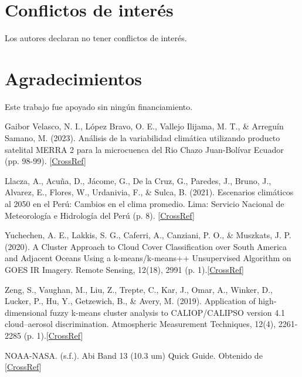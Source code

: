 \documentclass[twocolumn]{IECEjournal} %
\begin{document}
\section*{Conflictos de interés}
Los autores declaran no tener conflictos de interés.

\section*{Agradecimientos}
Este trabajo fue apoyado sin ningún financiamiento.

%

\begin{fullwidth}
\renewcommand{\bibname}{Referencias}
\begin{thebibliography}{99}
 Gaibor Velasco, N. I., López Bravo, O. E., Vallejo Ilijama, M. T., \& Arreguín Samano, M. (2023). Análisis de la variabilidad climática utilizando producto satelital MERRA 2 para la microcuenca del Rio Chazo Juan-Bolívar Ecuador (pp. 98-99). [\href{https://doi.org/10.5281/zenodo.7930679}{CrossRef}]

 Llacza, A., Acuña, D., Jácome, G., De la Cruz, G., Paredes, J., Bruno, J., Alvarez, E., Flores, W., Urdanivia, F., \& Sulca, B. (2021). Escenarios climáticos al 2050 en el Perú: Cambios en el clima promedio. Lima: Servicio Nacional de Meteorología e Hidrología del Perú (p. 8). [\href{https://hdl.handle.net/20.500.12542/1470}{CrossRef}]

 Yuchechen, A. E., Lakkis, S. G., Caferri, A., Canziani, P. O., \& Muszkats, J. P. (2020). A Cluster Approach to Cloud Cover Classification over South America and Adjacent Oceans Using a k-means/k-means++ Unsupervised Algorithm on GOES IR Imagery. Remote Sensing, 12(18), 2991 (p. 1).[\href{https://doi.org/10.3390/rs12182991}{CrossRef}]

 Zeng, S., Vaughan, M., Liu, Z., Trepte, C., Kar, J., Omar, A., Winker, D., Lucker, P., Hu, Y., Getzewich, B., \& Avery, M. (2019). Application of high-dimensional fuzzy k-means cluster analysis to CALIOP/CALIPSO version 4.1 cloud–aerosol discrimination. Atmospheric Measurement Techniques, 12(4), 2261-2285 (p. 1).[\href{https://doi.org/10.5194/amt-12-2261-2019}{CrossRef}]

 NOAA-NASA. (s.f.). Abi Band 13 (10.3 um) Quick Guide. Obtenido de [\href{http://cimss.ssec.wisc.edu/goes/OCLOFactSheetPDFs/ABIQuickGuide_Band13.pdf}{CrossRef}]


\end{thebibliography}
\end{fullwidth}
\end{document}
